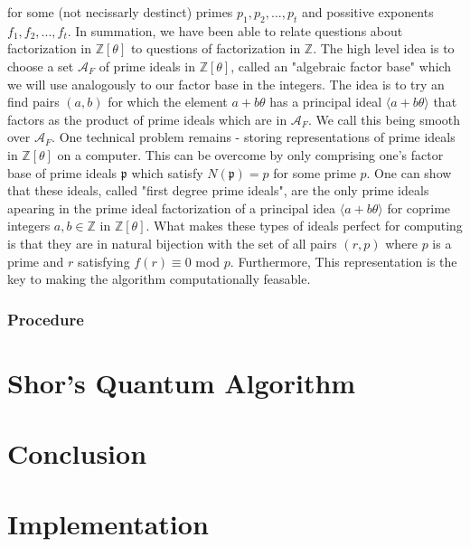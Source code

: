 \documentclass[10pt,a4paper]{article}
\theoremstyle{plain}
\theoremstyle{definition}
\theoremstyle{remark}
\newcommand{\Z}{\mathbb{Z}}
\newcommand{\A}{\mathcal{A}_F}
\begin{document}
    for some (not necissarly destinct) primes $p_1, p_2, ..., p_t$ and possitive exponents $f_1,f_2,...,f_t$. In summation, we have been able to relate questions about factorization in $\Z[\theta]$ to questions of factorization in $\Z$. The high level idea is to choose a set $\A$ of prime ideals in $\Z[\theta]$, called an "algebraic factor base" which we will use analogously to our factor base in the integers. The idea is to try an find pairs $(a,b)$ for which the element $a + b \theta$ has a principal ideal $\langle a+ b \theta \rangle$ that factors as the product of prime ideals which are in $\A$. We call this being smooth over $\A$. One technical problem remains - storing representations of prime ideals in $\Z[\theta]$ on a computer. This can be overcome by only comprising one's factor base of prime ideals $\mathfrak{p}$ which satisfy $N(\mathfrak{p})=p$ for some prime $p$. One can show that these ideals, called "first degree prime ideals", are the only prime ideals apearing in the prime ideal factorization of a principal idea $\langle a + b \theta \rangle $ for coprime integers $a,b\in \Z$ in $\Z[\theta]$. What makes these types of ideals perfect for computing is that they are in natural bijection with the set of all pairs $(r,p)$ where $p$ is a prime and $r$ satisfying $f(r) \equiv 0$ mod $p$. Furthermore, This representation is the key to making the algorithm computationally feasable.  
    \subsubsection{Procedure} \label{procedure}






\section{Shor's Quantum Algorithm}

\section{Conclusion}

\section{Implementation}
\end{document}
